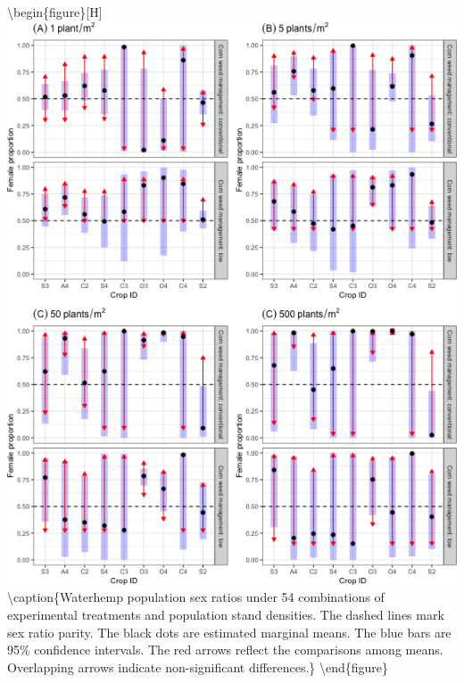 \documentclass[
]{article}
\begin{document}
\textbackslash begin\{figure\}{[}H{]}
\includegraphics[width=1\linewidth]{Manuscript_whole_files/figure-latex/sexr18-dens-arrow-1} \textbackslash caption\{Waterhemp population sex ratios under 54 combinations of experimental treatments and population stand densities. The dashed lines mark sex ratio parity. The black dots are estimated marginal means. The blue bars are 95\% confidence intervals. The red arrows reflect the comparisons among means. Overlapping arrows indicate non-significant differences.\}\label{fig:sexr18-dens-arrow}
\textbackslash end\{figure\}
\end{document}
